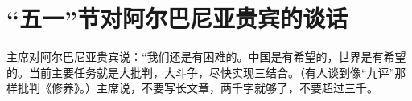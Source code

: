 \section[ “五一”节对阿尔巴尼亚贵宾的谈话（一九六七年五月一日）]{ “五一”节对阿尔巴尼亚贵宾的谈话}


主席对阿尔巴尼亚贵宾说：“我们还是有困难的。中国是有希望的，世界是有希望的。当前主要任务就是大批判，大斗争，尽快实现三结合。（有人谈到像“九评”那样批判《修养》。）主席说，不要写长文章，两千字就够了，不要超过三千。

